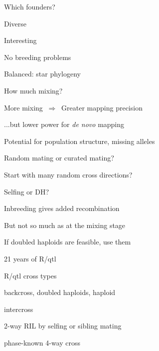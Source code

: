 \documentclass[12pt,t,aspectratio=169]{beamer}
\begin{document}
\begin{frame}[c]{Which founders?}

  \bbi
\item Diverse
\item Interesting
\item No breeding problems
\item Balanced: star phylogeny
  \ei

\end{frame}



\begin{frame}[c]{How much mixing?}

  \bbi
  \item More mixing $ \ \Rightarrow \ $ Greater mapping precision
\item ...but lower power for \emph{de novo\/} mapping
\item Potential for population structure, missing alleles
\item \hilit Random mating or curated mating?
\item \hilit Start with many random cross directions?
  \ei

\end{frame}


\begin{frame}[c]{Selfing or DH?}

\bbi
\item Inbreeding gives added recombination
\item But not so much as at the mixing stage
\item \hilit If doubled haploids are feasible, use them
  \ei

\end{frame}





\begin{frame}[c]{21 years of R/qtl}


\end{frame}




\begin{frame}{R/qtl cross types}

\bbi
\item backcross{\lolit , doubled haploids, haploid}

\item intercross

\item 2-way RIL {\lolit by selfing or sibling mating}

\item phase-known 4-way cross
\ei

\end{frame}
\end{document}
